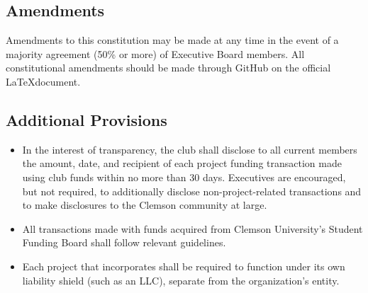 \documentclass{article}
\begin{document}
\subsection{Amendments}
Amendments to this constitution may be made at any time in the event of a majority agreement (50\% or more) of Executive Board members. All constitutional amendments should be made through GitHub on the official \LaTeX document.

\subsection{Additional Provisions}

\begin{itemize}
    \item In the interest of transparency, the club shall disclose to all current members the amount, date, and recipient of each project funding transaction made using club funds within no more than 30 days. Executives are encouraged, but not required, to additionally disclose non-project-related transactions and to make disclosures to the Clemson community at large.
    \item All transactions made with funds acquired from Clemson University's Student Funding Board shall follow relevant guidelines. 
    \item Each project that incorporates shall be required to function under its own liability shield (such as an LLC), separate from the organization's entity.
\end{itemize}
\end{document}
